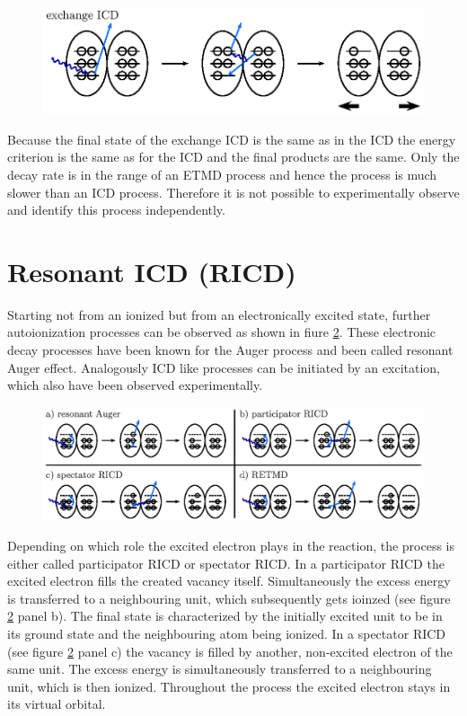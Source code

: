 \begin{figure}[h]
 \centering
 \includegraphics{pics/exicd-pspic.eps}
 \caption{}
 \label{figure:exICD_process}
\end{figure}

Because the final state of the exchange ICD is the same as in the ICD the energy
criterion is the same as for the ICD and the final products are the same. Only
the decay rate is in the range of an ETMD process and hence the process is much
slower than an ICD process. Therefore it is not possible to experimentally
observe and identify this process independently.


\section{Resonant ICD (RICD)}
Starting not from an ionized but from an electronically excited state, further
autoionization processes can be observed
as shown in fiure \ref{figure:ricd_processes}.
These electronic decay processes have been known for
the Auger process and been called resonant Auger effect. Analogously ICD like
processes can be initiated by an excitation, which also have been observed
experimentally.

\begin{figure}[h]
 \centering
 \includegraphics{pics/ricd-pspic.eps}
 \caption{}
 \label{figure:ricd_processes}
\end{figure}

Depending on which role the excited
electron plays in the reaction, the process is either called participator \ac{RICD}
or spectator \ac{RICD}.
In a participator \ac{RICD} the excited electron fills the created vacancy itself.
Simultaneously the excess energy is transferred to a neighbouring unit, which
subsequently gets ioinzed (see figure \ref{figure:ricd_processes} panel b).
The final state is characterized
by the initially excited unit to be in its ground state and the neighbouring atom
being ionized.
In a spectator \ac{RICD} (see figure \ref{figure:ricd_processes} panel c)
the vacancy is filled by another, non-excited electron
of the same unit. The excess energy is simultaneously transferred to a neighbouring
unit, which is then ionized. Throughout the process the excited electron stays
in its virtual orbital.

